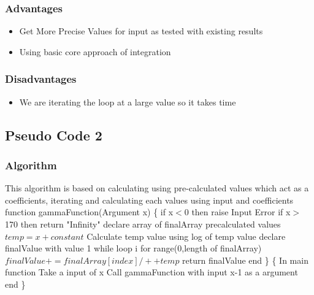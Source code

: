 \documentclass{article}
\begin{document}
\subsubsection{Advantages}
\begin{itemize}
\item Get More Precise Values for input as tested with existing results
\item Using basic core approach of integration
\end{itemize}
\subsubsection{Disadvantages}
\begin{itemize}
\item We are iterating the loop at a large value so it takes time
\end{itemize}
\subsection{Pseudo Code 2}
\subsubsection{Algorithm}
This algorithm is based on calculating using pre-calculated values which act as a coefficients, iterating and calculating each values using input and coefficients\newline\newline
function gammaFunction(Argument x) \{ \newline
\indent \indent if x$<$0\newline
\indent \indent \indent \indent then raise Input Error\newline
\indent \indent if x$>$170\newline
\indent \indent \indent then return "Infinity"\newline\newline
\indent \indent declare array of finalArray precalculated values\newline
\indent \indent$temp = x + constant$\newline
\indent \indent Calculate temp value using log of temp value\newline
\indent \indent declare finalValue with value 1\newline\newline
\indent \indent while loop i for range(0,length of finalArray)\newline
\indent \indent \indent \indent $finalValue += finalArray[index]/ ++temp$\newline
\indent \indent return finalValue\newline
end\newline
\}\newline
\{\newline
In main function\newline
\indent \indent Take a input of x\newline
\indent \indent Call gammaFunction with input x-1 as a argument \newline
end \newline
\}  \newline
\end{document}
